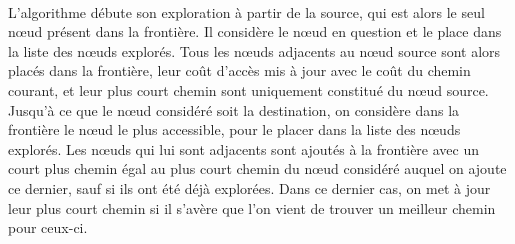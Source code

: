 \documentclass[pidr]{tnreport}
\begin{document}
\paragraph{}		
L'algorithme débute son exploration à partir de la source, qui est alors le seul nœud présent dans la frontière. Il considère le nœud en question et le place dans la liste des nœuds explorés. Tous les nœuds adjacents au nœud source sont alors placés dans la frontière, leur coût d'accès mis à jour avec le coût du chemin courant, et leur plus court chemin sont uniquement constitué du nœud source. Jusqu'à ce que le nœud considéré soit la destination, on considère dans la frontière le nœud le plus accessible, pour le placer dans la liste des nœuds explorés. Les nœuds qui lui sont adjacents sont ajoutés à la frontière avec un court plus chemin égal au plus court chemin du nœud considéré auquel on ajoute ce dernier, sauf si ils ont été déjà explorées. Dans ce dernier cas, on met à jour leur plus court chemin si il s'avère que l'on vient de trouver un meilleur chemin pour ceux-ci.   
\end{document}
